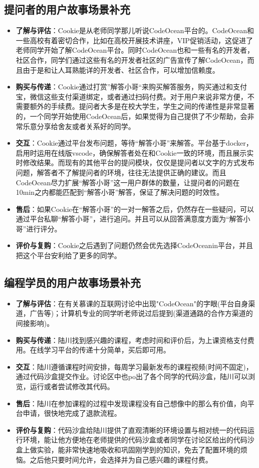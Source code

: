 \documentclass[a4paper]{ctexart}
\begin{document}
\subsection{提问者的用户故事场景补充}
\begin{itemize}
  \item \textbf{了解与评估}：Cookie是从老师同学那儿听说CodeOcean平台的。CodeOcean和一些高校有着密切合作，比如在高校开展技术讲座，VIP促销活动，这促进了老师同学开始了解CodeOcean平台。同时CodeOcean也和一些有名的开发者，社区合作，同学们通过这些有名的开发者社区的广告宣传了解CodeOcean，而且由于是和让人耳熟能详的开发者、社区合作，可以增加信赖度。
  \item \textbf{购买与传递}：Cookie通过打赏”解答小哥“来购买解答服务，购买通过和支付宝，微信这些支付渠道绑定，或者通过扫码付费。对于用户来说非常方便，不需要额外的手续费。提问者大多是在校大学生，学生之间的传递性是非常显著的，一个同学开始使用CodeOcean后，如果觉得为自己提供了不少帮助，会非常乐意分享给舍友或者关系好的同学。
  \item \textbf{交互}：Cookie通过平台发布问题，等待“解答小哥”来解答。平台基于docker，启用时运用在线版vscode，确保解答者处在和Cookie一致的环境，而且展示实时修改结果。而现有的其他平台的提问模块，仅仅是提问者以文字的方式发布问题，解答者不了解提问者的环境，往往无法提供正确的建议。而且CodeOcean尽力扩展“解答小哥”这一用户群体的数量，让提问者的问题在10min之内都能匹配到“解答小哥”解答，保证了解决问题的时效性。
  \item \textbf{售后}：如果Cookie在“解答小哥”的一对一解答之后，仍然存在一些疑问，可以通过平台私聊“解答小哥”，进行追问。并且可以从回答满意度方面为“解答小哥”进行评分。
  \item \textbf{评价与复购}：Cookie之后遇到了问题仍然会优先选择CodeOceanin平台，并且把这个平台安利给了更多的同学。
\end{itemize}

\subsection{编程学员的用户故事场景补充}
\begin{itemize}
  \item \textbf{了解与评估}：在有关慕课的互联网讨论中出现"CodeOcean"的字眼(平台自身渠道，广告等)；计算机专业的同学听老师说过后提到(渠道通路的合作方渠道的间接影响)。
  \item \textbf{购买与传递}：陆川找到感兴趣的课程，考虑时间和评价后，为上课资格支付费用。在线学习平台的传递十分简单，买后即可用。
  \item \textbf{交互}：陆川遵循课程时间安排，每周学习最新发布的课程视频(时间不固定)，通过代码沙盒提交作业。讨论区中也po出了各个同学的代码沙盒，陆川可以浏览，运行或者尝试修改其代码。
  \item \textbf{售后}：陆川在参加课程的过程中发现课程没有自己想像中的那么有价值，向平台申请，很快地完成了退款流程。
  \item \textbf{评价与复购}：代码沙盒给陆川提供了直观清晰的环境设置与相对统一的代码运行环境，能让他方便地在老师提供的代码沙盒或者同学在讨论区给出的代码沙盒上做实验，能非常快速地吸收和巩固刚学到的知识，免去了配置环境的烦恼。之后他只要时间允许，会选择并为自己感兴趣的课程付费。
\end{itemize}
\end{document}
